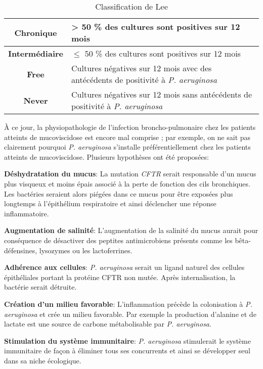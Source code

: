 \documentclass[12pt,a4paper]{article}
\begin{document}
 \begin{table}[h]
     \centering
     \caption{Classification de Lee \cite{Lee2003}}
     \begin{tabular}{|c|p{10cm}|}
      \hline
          \textbf{Chronique} & > 50 \% des cultures sont positives sur 12 mois \\
         \hline
         \textbf{Intermédiaire} & $\leq$ 50 \% des cultures sont positives sur  12 mois\\
          \hline
          \textbf{Free} & Cultures négatives sur 12 mois avec des antécédents de positivité à \textit{P. aeruginosa}\\
         \hline
	    \textbf{Never} & Cultures négatives sur 12 mois sans antécédents de positivité à \textit{P. aeruginosa} \\
	      \hline
     \end{tabular}
     \label{lee}
 \end{table}


À ce jour, la physiopathologie de l'infection broncho-pulmonaire chez les patients atteints de mucoviscidose est encore mal comprise ; par exemple, on ne sait pas clairement pourquoi \textit{P. aeruginosa} s’installe préférentiellement chez les patients atteints de mucoviscidose. Plusieurs hypothèses ont été proposées:

\textbf{Déshydratation du mucus}\cite{Davies}:
La mutation \textit{CFTR} serait responsable d'un mucus plus visqueux et moins épais associé à la perte de fonction des cils bronchiques. Les bactéries seraient alors piégées dans ce mucus pour être exposées plus longtemps à l'épithélium respiratoire et ainsi déclencher une réponse inflammatoire.

\textbf{Augmentation de salinité}\cite{Davies}:
L'augmentation de la salinité du mucus aurait pour conséquence de désactiver des peptites antimicrobiens présents comme les bêta-défensines, lysozymes ou les lactoferrines.

\textbf{Adhérence aux cellules}\cite{Davies}:
\textit{P. aeruginosa} serait un ligand naturel des cellules épithéliales portant la protéine CFTR non mutée. Après internalisation, la bactérie serait détruite.

\textbf{Création d'un milieu favorable}:
L'inflammation précède la colonisation à \textit{P. aeruginosa} et crée un milieu favorable.
Par exemple la production d'alanine et de lactate \cite{Boulette2009} est une source de carbone métabolisable par \textit{P. aeruginosa}.

\textbf{Stimulation du système immunitaire}:
\textit{P. aeruginosa} stimulerait le système immunitaire de façon à éliminer tous ses concurrents et ainsi se développer seul dans sa niche écologique\cite{Pernet2015}.
\end{document}
